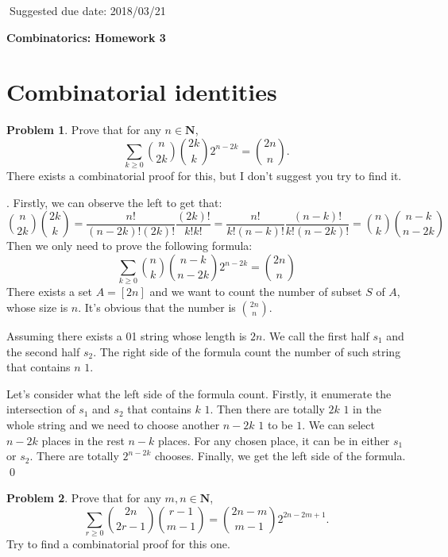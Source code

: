 \documentclass[12pt]{article}
\theoremstyle{definition}
\newtheorem{hw}{Problem}
\newenvironment{sol}
  {\par\vspace{3mm}\noindent{\it Solution}.}
  {\qed}
\newcommand{\bn}{{\mathbf N}}
\begin{document}
$\;$\hfill Suggested due date: 2018/03/21

\bigskip

\begin{center}
{\LARGE\bf Combinatorics: Homework 3}
\end{center}

\bigskip

\section{Combinatorial identities}

\begin{hw}
Prove that for any $n \in \bn$,
\[\sum_{k \geq 0} \binom{n}{2k} \binom{2k}{k} 2^{n-2k} =
  \binom{2n}{n}.\]
There exists a combinatorial proof for this, but I don't suggest you try to find it.
\end{hw}

\begin{sol}
	Firstly, we can observe the left to get that:
	$$
		\binom{n}{2k}\binom{2k}{k} = \frac{n!}{(n-2k)!(2k)!}\frac{(2k)!}{k!k!} = \frac{n!}{k!(n-k)!}\frac{(n-k)!}{k!(n-2k)!} = \binom{n}{k}\binom{n-k}{n-2k}
	$$
	Then we only need to prove the following formula:
	$$
	\sum_{k \geq 0} \binom{n}{k}\binom{n-k}{n-2k} 2^{n-2k} = \binom{2n}{n}
	$$
	There exists a set $A = [2n]$ and we want to count the number of subset $S$ of $A$, whose size is $n$. It's obvious that the number is $\binom{2n}{n}$.
	
	Assuming there exists a 01 string whose length is $2n$. We call the first half $s_1$ and the second half $s_2$. The right side of the formula count the number of such string that contains $n$ $1$. 
	
	Let's consider what the left side of the formula count. Firstly, it enumerate the intersection of $s_1$ and $s_2$ that contains $k$ $1$. Then there are totally $2k$ $1$ in the whole string and we need to choose another $n - 2k$ $1$ to be $1$. We can select $n-2k$ places in the rest $n-k$ places. For any chosen place, it can be in either $s_1$ or $s_2$. There are totally $2^{n-2k}$ chooses. Finally, we get the left side of the formula.
\end{sol}

\begin{hw}
Prove that for any $m, n \in \bn$,
\[
\sum_{r \geq 0} \binom{2n}{2r-1} \binom{r-1}{m-1} = \binom{2n-m}{m-1} 2^{2n-2m+1}.
\]
Try to find a combinatorial proof for this one.
\end{hw}
\end{document}
